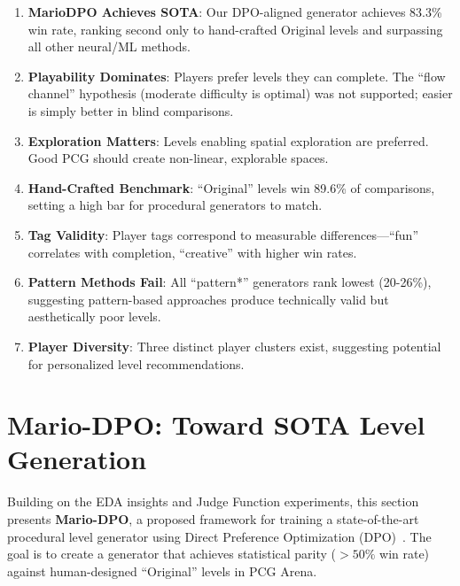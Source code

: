 \documentclass[11pt,a4paper]{article}
\theoremstyle{plain}
\theoremstyle{definition}
\theoremstyle{remark}
\begin{document}
\begin{enumerate}
    \item \textbf{MarioDPO Achieves SOTA}: Our DPO-aligned generator achieves 83.3\% win rate, ranking second only to hand-crafted Original levels and surpassing all other neural/ML methods.
    
    \item \textbf{Playability Dominates}: Players prefer levels they can complete. The ``flow channel'' hypothesis (moderate difficulty is optimal) was not supported; easier is simply better in blind comparisons.
    
    \item \textbf{Exploration Matters}: Levels enabling spatial exploration are preferred. Good PCG should create non-linear, explorable spaces.
    
    \item \textbf{Hand-Crafted Benchmark}: ``Original'' levels win 89.6\% of comparisons, setting a high bar for procedural generators to match.
    
    \item \textbf{Tag Validity}: Player tags correspond to measurable differences---``fun'' correlates with completion, ``creative'' with higher win rates.
    
    \item \textbf{Pattern Methods Fail}: All ``pattern*'' generators rank lowest (20-26\%), suggesting pattern-based approaches produce technically valid but aesthetically poor levels.
    
    \item \textbf{Player Diversity}: Three distinct player clusters exist, suggesting potential for personalized level recommendations.
\end{enumerate}

\section{Mario-DPO: Toward SOTA Level Generation}
\label{sec:mario-dpo}

Building on the EDA insights and Judge Function experiments, this section presents \textbf{Mario-DPO}, a proposed framework for training a state-of-the-art procedural level generator using Direct Preference Optimization (DPO)~\cite{rafailov2023dpo}. The goal is to create a generator that achieves statistical parity ($>50\%$ win rate) against human-designed ``Original'' levels in PCG Arena.
\end{document}
